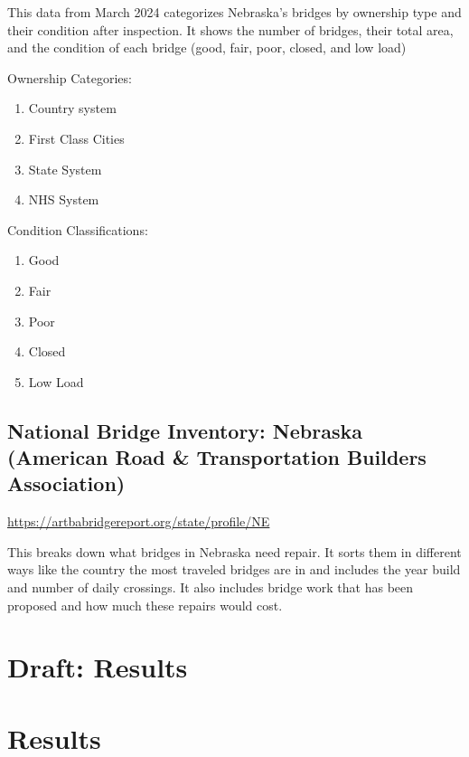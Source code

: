 \documentclass[
  letterpaper,
  DIV=11,
  numbers=noendperiod]{scrreprt}
\providecommand{\tightlist}{%
  \setlength{\itemsep}{0pt}\setlength{\parskip}{0pt}}\usepackage{longtable,booktabs,array}
\begin{document}
This data from March 2024 categorizes Nebraska's bridges by ownership
type and their condition after inspection. It shows the number of
bridges, their total area, and the condition of each bridge (good, fair,
poor, closed, and low load)

Ownership Categories:

\begin{enumerate}
\def\labelenumi{\arabic{enumi}.}
\tightlist
\item
  Country system
\item
  First Class Cities
\item
  State System
\item
  NHS System
\end{enumerate}

Condition Classifications:

\begin{enumerate}
\def\labelenumi{\arabic{enumi}.}
\tightlist
\item
  Good
\item
  Fair
\item
  Poor
\item
  Closed
\item
  Low Load
\end{enumerate}

\section{National Bridge Inventory: Nebraska (American Road \&
Transportation Builders
Association)}\label{national-bridge-inventory-nebraska-american-road-transportation-builders-association}

\url{https://artbabridgereport.org/state/profile/NE}

This breaks down what bridges in Nebraska need repair. It sorts them in
different ways like the country the most traveled bridges are in and
includes the year build and number of daily crossings. It also includes
bridge work that has been proposed and how much these repairs would
cost.

\chapter{Draft: Results}\label{draft-results}

\chapter{Results}\label{results-2}
\end{document}
